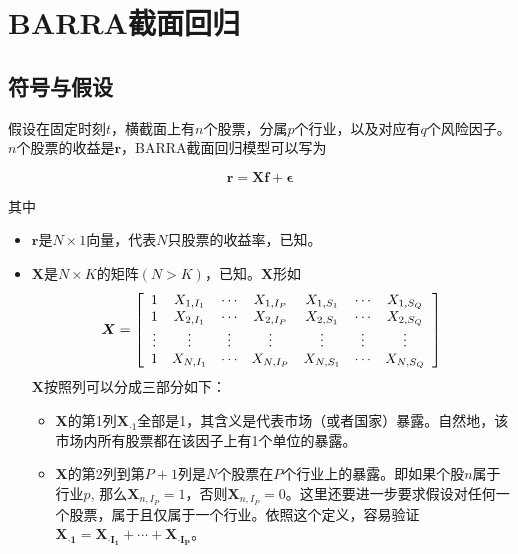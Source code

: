 \section{BARRA截面回归}

\subsection{符号与假设}

假设在固定时刻$t$，横截面上有$n$个股票，分属$p$个行业，以及对应有$q$个风险因子。$n$个股票的收益是$\bm{r}$，BARRA截面回归模型可以写为

\begin{equation}
    \bm{r} = \bm{Xf} + \bm{\epsilon}
\end{equation}

其中

\begin{itemize}
    \item $\bm{r}$是$N\times 1$向量，代表$N$只股票的收益率，已知。
    \item $\bm{X}$是$N\times K$的矩阵$(N>K)$，已知。$\bm{X}$形如
          \begin{equation}
              \bm{X} = \left[
                  \begin{array}{c ccc ccc}
                      1      & X_{1,I_1} & \cdots & X_{1, I_P} & X_{1,S_1} & \cdots & X_{1, S_Q} \\
                      1      & X_{2,I_1} & \cdots & X_{2, I_P} & X_{2,S_1} & \cdots & X_{2, S_Q} \\
                      \vdots & \vdots    & \vdots & \vdots     & \vdots    & \vdots & \vdots     \\
                      1      & X_{N,I_1} & \cdots & X_{N, I_P} & X_{N,S_1} & \cdots & X_{N, S_Q} \\
                  \end{array}
                  \right]
          \end{equation}
          $\bm{X}$按照列可以分成三部分如下：
          \begin{itemize}
              \item $\bm{X}$的第1列$\bm{X}_{\cdot1}$全部是1，其含义是代表市场（或者国家）暴露。自然地，该市场内所有股票都在该因子上有1个单位的暴露。
              \item $\bm{X}$的第2列到第$P+1$列是$N$个股票在$P$个行业上的暴露。即如果个股$n$属于行业$p$, 那么$\bm{X}_{n,I_P} = 1$，否则$\bm{X}_{n,I_P} = 0$。这里还要进一步要求假设对任何一个股票，属于且仅属于一个行业。依照这个定义，容易验证$\bm{X_{\cdot1}} = \bm{X_{\cdot I_1}} + \cdots + \bm{X_{\cdot I_P}}$。

\end{itemize}
\end{itemize}

